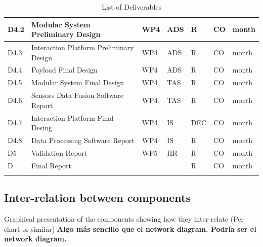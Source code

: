\begin{longtable}[H]{p{1.8cm} p{2cm} p{1.3cm} p{1.8cm} p{1.3cm} p{2.1cm} p{1.8cm}}
 	\midrule

	D4.2 & Modular System Preliminary Design & WP4 & ADS & R & CO & month  \vspace{0.2cm} \\
	
	\midrule
	
	D4.3 & Interaction Platform Preliminary Design  & WP4 & ADS & R & CO & month  \vspace{0.2cm} \\

	\midrule

 	D4.4 & Payload Final Design & WP4 & ADS & R & CO & month  \vspace{0.2cm} \\

 	\midrule

	D4.5 & Modular System  Final Design & WP4 & TAS & R & CO & month  \vspace{0.2cm} \\
	
	\midrule
	
	D4.6 & Sensors Data Fusion Software Report  & WP4 & TAS & R & CO & month  \vspace{0.2cm} \\

	\midrule

 	D4.7 & Interaction Platform Final Desing  & WP4 & IS & DEC & CO & month  \vspace{0.2cm} \\

 	\midrule

	D4.8 & Data Processing Software Report & WP4 & IS & R & CO & month  \vspace{0.2cm} \\
	
	\midrule
	
	D5 & Validation Report & WP5 & HR & R & CO & month  \vspace{0.2cm} \\

	\midrule

 	D & Final Report &  &  & R & CO & month  \vspace{0.2cm} \\
	
	\bottomrule[2pt]
	
	\caption{List of Deliverables}
	\label{Deliverables}
\end{longtable}


\subsection{Inter-relation between components}

Graphical presentation of the components showing how they inter-relate (Per chart or similar) \textbf{Algo más sencillo que el network diagram. Podría ser el network diagram.}


